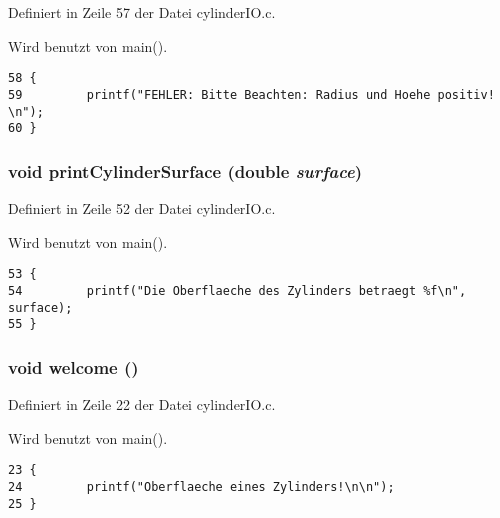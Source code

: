 Definiert in Zeile 57 der Datei cylinder\-IO.c.

Wird benutzt von main().

\footnotesize\begin{verbatim}58 {
59         printf("FEHLER: Bitte Beachten: Radius und Hoehe positiv! \n");
60 }
\end{verbatim}\normalsize 


\subsubsection{\setlength{\rightskip}{0pt plus 5cm}void print\-Cylinder\-Surface (double {\em surface})}\label{cylinder_i_o_8h_d946199312576e1ff9d3ac37a8bedacf}




Definiert in Zeile 52 der Datei cylinder\-IO.c.

Wird benutzt von main().

\footnotesize\begin{verbatim}53 {
54         printf("Die Oberflaeche des Zylinders betraegt %f\n", surface);
55 }
\end{verbatim}\normalsize 


\subsubsection{\setlength{\rightskip}{0pt plus 5cm}void welcome ()}\label{cylinder_i_o_8h_fdf71b0239b7d4a9b67b784177146385}




Definiert in Zeile 22 der Datei cylinder\-IO.c.

Wird benutzt von main().

\footnotesize\begin{verbatim}23 {
24         printf("Oberflaeche eines Zylinders!\n\n");
25 }
\end{verbatim}\normalsize 



